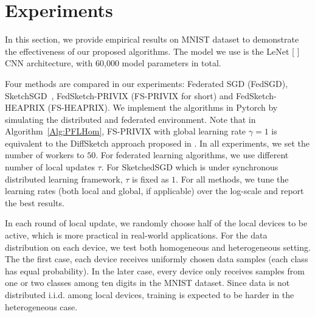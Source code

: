 \section{Experiments}

In this section, we provide empirical results on MNIST dataset to demonstrate the effectiveness of our proposed algorithms. The model we use is the LeNet [ ] CNN architecture, with 60,000 model parameters in total.

Four methods are compared in our experiments: Federated SGD (FedSGD), SketchSGD~\cite{ivkin2019communication}, FedSketch-PRIVIX (FS-PRIVIX for short) and FedSketch-HEAPRIX (FS-HEAPRIX). We implement the algorithms in Pytorch by simulating the distributed and federated environment. Note that in Algorithm~\ref{Alg:PFLHom}, FS-PRIVIX with global learning rate $\gamma=1$ is equivalent to the DiffSketch approach proposed in \cite{li2018federated}. In all experiments, we set the number of workers to $50$. For federated learning algorithms, we use different number of local updates $\tau$. For SketchedSGD which is under synchronous distributed learning framework, $\tau$ is fixed as $1$. For all methods, we tune the learning rates (both local and global, if applicable) over the log-scale and report the best results.

In each round of local update, we randomly choose half of the local devices to be active, which is more practical in real-world applications. For the data distribution on each device, we test both homogeneous and heterogeneous setting. The the first case, each device receives uniformly chosen data samples (each class has equal probability). In the later case, every device only receives samples from one or two classes among ten digits in the MNIST dataset. Since data is not distributed i.i.d. among local devices, training is expected to be harder in the heterogeneous case.

